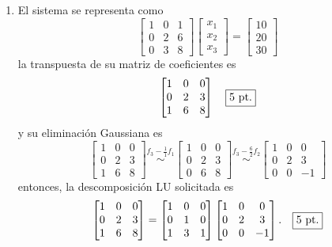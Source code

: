 \documentclass[11pt]{article}
\begin{document}
\begin{enumerate}
\begin{enumerate}
	\item El sistema se representa como
    $$
	\begin{bmatrix}
    1  & 0 & 1\\
    0 & 2 & 6\\
    0 & 3& 8
    \end{bmatrix}
    \begin{bmatrix}x_1\\x_2\\x_3\end{bmatrix}
    =
    \begin{bmatrix}10\\20\\30\end{bmatrix}
    $$
    la transpuesta de su matriz de coeficientes es
    $$
	\begin{bmatrix}
    1 & 0 & 0	\\
    0 & 2& 3  	\\
    1  & 6 & 8
    \end{bmatrix} \quad \fbox{5 pt.}
	$$
    y su eliminaci\'on Gaussiana es
    $$
    \begin{bmatrix}
    1 & 0 & 0	\\
    0 & 2& 3  	\\
    1  & 6 & 8
    \end{bmatrix}
    \stackrel{f_3-\frac{1}{1}f_1}{\sim}
    \begin{bmatrix}
    1 & 0 & 0	\\
    0 & 2& 3  	\\
    0  & 6 & 8
    \end{bmatrix}
   	\stackrel{f_3-\frac{6}{2}f_2}{\sim}
   \begin{bmatrix}
    1 & 0 & 0	\\
    0 & 2& 3  	\\
    0  & 0 & -1
    \end{bmatrix}
    $$
    entonces, la descomposici\'on LU solicitada es
    $$
    \begin{bmatrix}
    1 & 0 & 0	\\
    0 & 2& 3  	\\
    1  & 6 & 8
    \end{bmatrix}
    =
    \begin{bmatrix}
    1 & 0 & 0 \\
    0 & 1 & 0 \\
    1 & 3 & 1
    \end{bmatrix}
       \begin{bmatrix}
    1 & 0 & 0	\\
    0 & 2& 3  	\\
    0  & 0 & -1
    \end{bmatrix}. \quad \fbox{5 pt.}
    $$
    

\end{enumerate}
\end{enumerate}
\end{document}
